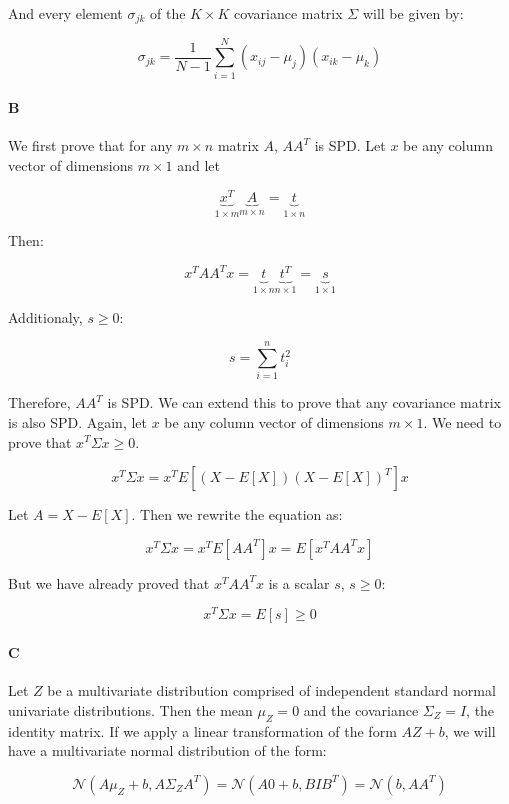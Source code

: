\documentclass[12pt]{article}
\begin{document}
And every element $\sigma_{jk}$ of the $K \times K$ covariance matrix $\Sigma$ will be given by:

\begin{equation}
\sigma_{jk}=\frac{1}{N-1}\displaystyle\sum_{i=1}^{N}{(x_{ij}-\mu_j)(x_{ik}-\mu_{k})}
\end{equation}

\paragraph{B}

We first prove that for any $m \times n$ matrix $A$, $AA^T$ is SPD. Let $x$ be any column vector of dimensions $m\times1$ and let

\[
\underbrace{x^T}_{1\times m}\underbrace{A}_{m\times n}=\underbrace{t}_{1\times n}
\]

Then:

\[
x^TAA^Tx = \underbrace{t}_{1\times n}\underbrace{t^T}_{n \times 1} = \underbrace{s}_{1\times 1}
\]

Additionaly, $s\geq 0$:

\[s = \displaystyle\sum_{i=1}^n{t_i^2}\]

Therefore, $AA^T$ is SPD. We can extend this to prove that any covariance matrix is also SPD. Again, let $x$ be any column vector of dimensions $m\times1$. We need to prove that $x^T\Sigma x \geq 0$.

\[
x^T\Sigma x=x^TE\left[\left(X-E[X]\right)\left(X-E[X]\right)^T\right]x
\]

Let $A=X-E[X]$. Then we rewrite the equation as:

\[
x^T\Sigma x=x^TE\left[AA^T\right]x = E\left[x^TAA^Tx\right]
\]

But we have already proved that $x^TAA^Tx$ is a scalar $s$, $s \geq 0$:

\[
x^T\Sigma x  =E\left[s\right] \geq 0
\]

\paragraph{C}
Let $Z$ be a multivariate distribution comprised of independent standard normal univariate distributions. Then the mean $\mu_Z = 0$ and the covariance $\Sigma_Z=I$, the identity matrix. If we apply a linear transformation of the form $AZ + b$, we will have a multivariate normal distribution of the form:

\[
\mathcal{N}\left(A\mu_Z + b, A\Sigma_Z A^T\right) = \mathcal{N}\left(A0 + b, BIB^T\right) = \mathcal{N}\left(b, AA^T\right)
\]
\end{document}
